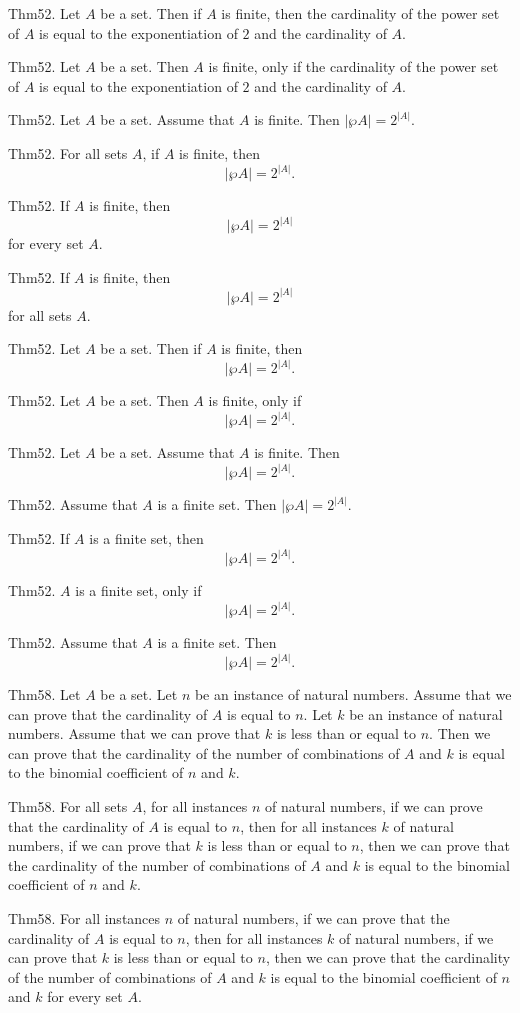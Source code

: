 \documentclass{article}
\begin{document}
Thm52. Let $A$ be a set. Then if $A$ is finite, then the cardinality of the power set of $A$ is equal to the exponentiation of $2$ and the cardinality of $A$.

Thm52. Let $A$ be a set. Then $A$ is finite, only if the cardinality of the power set of $A$ is equal to the exponentiation of $2$ and the cardinality of $A$.

Thm52. Let $A$ be a set. Assume that $A$ is finite. Then $| \wp A | = 2 ^ {| A |}$.

Thm52. For all sets $A$, if $A$ is finite, then $$| \wp A | = 2 ^ {| A |}.$$

Thm52. If $A$ is finite, then $$| \wp A | = 2 ^ {| A |}$$ for every set $A$.

Thm52. If $A$ is finite, then $$| \wp A | = 2 ^ {| A |}$$ for all sets $A$.

Thm52. Let $A$ be a set. Then if $A$ is finite, then $$| \wp A | = 2 ^ {| A |}.$$

Thm52. Let $A$ be a set. Then $A$ is finite, only if $$| \wp A | = 2 ^ {| A |}.$$

Thm52. Let $A$ be a set. Assume that $A$ is finite. Then $$| \wp A | = 2 ^ {| A |}.$$

Thm52. Assume that $A$ is a finite set. Then $| \wp A | = 2 ^ {| A |}$.

Thm52. If $A$ is a finite set, then $$| \wp A | = 2 ^ {| A |}.$$

Thm52. $A$ is a finite set, only if $$| \wp A | = 2 ^ {| A |}.$$

Thm52. Assume that $A$ is a finite set. Then $$| \wp A | = 2 ^ {| A |}.$$

Thm58. Let $A$ be a set. Let $n$ be an instance of natural numbers. Assume that we can prove that the cardinality of $A$ is equal to $n$. Let $k$ be an instance of natural numbers. Assume that we can prove that $k$ is less than or equal to $n$. Then we can prove that the cardinality of the number of combinations of $A$ and $k$ is equal to the binomial coefficient of $n$ and $k$.

Thm58. For all sets $A$, for all instances $n$ of natural numbers, if we can prove that the cardinality of $A$ is equal to $n$, then for all instances $k$ of natural numbers, if we can prove that $k$ is less than or equal to $n$, then we can prove that the cardinality of the number of combinations of $A$ and $k$ is equal to the binomial coefficient of $n$ and $k$.

Thm58. For all instances $n$ of natural numbers, if we can prove that the cardinality of $A$ is equal to $n$, then for all instances $k$ of natural numbers, if we can prove that $k$ is less than or equal to $n$, then we can prove that the cardinality of the number of combinations of $A$ and $k$ is equal to the binomial coefficient of $n$ and $k$ for every set $A$.
\end{document}
